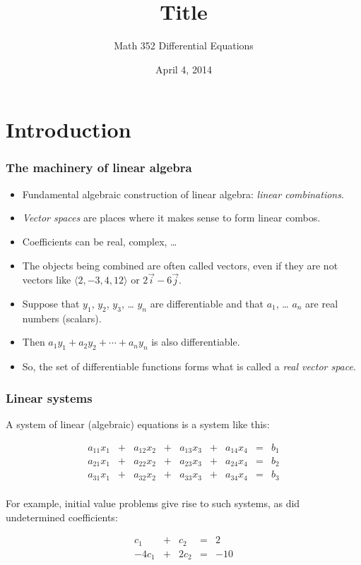 \documentclass[11pt,ignorenonframetext,]{beamer}
\title{Title}
\author{Math 352 Differential Equations}
\date{April 4, 2014}
\begin{document}
\frame{\titlepage}

\section{Introduction}

\begin{frame}\frametitle{The machinery of linear algebra}

\begin{itemize}
\item
  Fundamental algebraic construction of linear algebra: \emph{linear
  combinations}.
\item
  \emph{Vector spaces} are places where it makes sense to form linear
  combos.
\item
  Coefficients can be real, complex, \ldots{}
\item
  The objects being combined are often called vectors, even if they are
  not vectors like $\langle 2, -3, 4, 12 \rangle$ or
  $2 \vec{i} - 6 \vec{j}$.
\item
  Suppose that $y_1$, $y_2$, $y_3$, \ldots{} $y_n$ are differentiable
  and that $a_1$, \ldots{} $a_n$ are real numbers (scalars).
\item
  Then $a_1 y_1 + a_2 y_2 + \cdots + a_n y_n$ is also differentiable.
\item
  So, the set of differentiable functions forms what is called a
  \emph{real vector space}.
\end{itemize}

\end{frame}

\begin{frame}\frametitle{Linear systems}

A system of linear (algebraic) equations is a system like this:

\begin{equation*}
    \begin{array}{ccccccccc}
        a_{11} x_{1} &+& a_{12} x_{2} &+& a_{13} x_{3} &+& a_{14} x_{4} &=& b_1 \\
        a_{21} x_{1} &+& a_{22} x_{2} &+& a_{23} x_{3} &+& a_{24} x_{4} &=& b_2 \\
        a_{31} x_{1} &+& a_{32} x_{2} &+& a_{33} x_{3} &+& a_{34} x_{4} &=& b_3 \\
    \end{array}
\end{equation*}

For example, initial value problems give rise to such systems, as did
undetermined coefficients:

\begin{equation*}
    \begin{array}{ccccc}
        c_1   &+&  c_2 &=& 2 \\
        -4c_1 &+& 2c_2 &=& -10 \\
    \end{array}
\end{equation*}

\end{frame}
\end{document}
